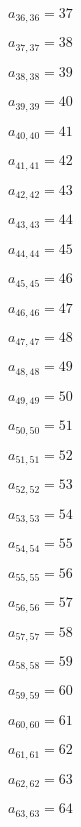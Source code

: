 \documentclass[a4paper,12pt]{article}
\begin{document}
$a _{ 36, 36 } = 37$

$a _{ 37, 37 } = 38$

$a _{ 38, 38 } = 39$

$a _{ 39, 39 } = 40$

$a _{ 40, 40 } = 41$

$a _{ 41, 41 } = 42$

$a _{ 42, 42 } = 43$

$a _{ 43, 43 } = 44$

$a _{ 44, 44 } = 45$

$a _{ 45, 45 } = 46$

$a _{ 46, 46 } = 47$

$a _{ 47, 47 } = 48$

$a _{ 48, 48 } = 49$

$a _{ 49, 49 } = 50$

$a _{ 50, 50 } = 51$

$a _{ 51, 51 } = 52$

$a _{ 52, 52 } = 53$

$a _{ 53, 53 } = 54$

$a _{ 54, 54 } = 55$

$a _{ 55, 55 } = 56$

$a _{ 56, 56 } = 57$

$a _{ 57, 57 } = 58$

$a _{ 58, 58 } = 59$

$a _{ 59, 59 } = 60$

$a _{ 60, 60 } = 61$

$a _{ 61, 61 } = 62$

$a _{ 62, 62 } = 63$

$a _{ 63, 63 } = 64$
\end{document}
